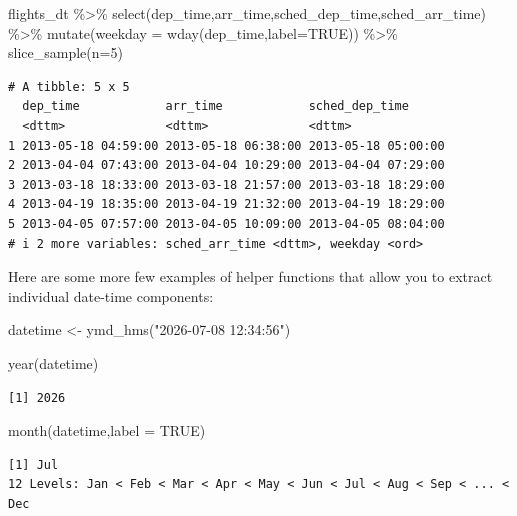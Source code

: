 \documentclass[
  letterpaper,
  DIV=11,
  numbers=noendperiod]{scrartcl}
\newenvironment{Shaded}{\begin{snugshade}}{\end{snugshade}}
\newcommand{\AttributeTok}[1]{\textcolor[rgb]{0.40,0.45,0.13}{#1}}
\newcommand{\ConstantTok}[1]{\textcolor[rgb]{0.56,0.35,0.01}{#1}}
\newcommand{\DecValTok}[1]{\textcolor[rgb]{0.68,0.00,0.00}{#1}}
\newcommand{\FunctionTok}[1]{\textcolor[rgb]{0.28,0.35,0.67}{#1}}
\newcommand{\NormalTok}[1]{\textcolor[rgb]{0.00,0.23,0.31}{#1}}
\newcommand{\OtherTok}[1]{\textcolor[rgb]{0.00,0.23,0.31}{#1}}
\newcommand{\SpecialCharTok}[1]{\textcolor[rgb]{0.37,0.37,0.37}{#1}}
\newcommand{\StringTok}[1]{\textcolor[rgb]{0.13,0.47,0.30}{#1}}
\begin{document}
\begin{Shaded}
\begin{Highlighting}[]
\NormalTok{flights\_dt }\SpecialCharTok{\%\textgreater{}\%}
   \FunctionTok{select}\NormalTok{(dep\_time,arr\_time,sched\_dep\_time,sched\_arr\_time) }\SpecialCharTok{\%\textgreater{}\%}
  \FunctionTok{mutate}\NormalTok{(}\AttributeTok{weekday =} \FunctionTok{wday}\NormalTok{(dep\_time,}\AttributeTok{label=}\ConstantTok{TRUE}\NormalTok{)) }\SpecialCharTok{\%\textgreater{}\%}
  \FunctionTok{slice\_sample}\NormalTok{(}\AttributeTok{n=}\DecValTok{5}\NormalTok{)}
\end{Highlighting}
\end{Shaded}

\begin{verbatim}
# A tibble: 5 x 5
  dep_time            arr_time            sched_dep_time     
  <dttm>              <dttm>              <dttm>             
1 2013-05-18 04:59:00 2013-05-18 06:38:00 2013-05-18 05:00:00
2 2013-04-04 07:43:00 2013-04-04 10:29:00 2013-04-04 07:29:00
3 2013-03-18 18:33:00 2013-03-18 21:57:00 2013-03-18 18:29:00
4 2013-04-19 18:35:00 2013-04-19 21:32:00 2013-04-19 18:29:00
5 2013-04-05 07:57:00 2013-04-05 10:09:00 2013-04-05 08:04:00
# i 2 more variables: sched_arr_time <dttm>, weekday <ord>
\end{verbatim}

Here are some more few examples of helper functions that allow you to
extract individual date-time components:

\begin{Shaded}
\begin{Highlighting}[]
\NormalTok{datetime }\OtherTok{\textless{}{-}} \FunctionTok{ymd\_hms}\NormalTok{(}\StringTok{"2026{-}07{-}08 12:34:56"}\NormalTok{)}

\FunctionTok{year}\NormalTok{(datetime)}
\end{Highlighting}
\end{Shaded}

\begin{verbatim}
[1] 2026
\end{verbatim}

\begin{Shaded}
\begin{Highlighting}[]
\FunctionTok{month}\NormalTok{(datetime,}\AttributeTok{label =} \ConstantTok{TRUE}\NormalTok{)}
\end{Highlighting}
\end{Shaded}

\begin{verbatim}
[1] Jul
12 Levels: Jan < Feb < Mar < Apr < May < Jun < Jul < Aug < Sep < ... < Dec
\end{verbatim}
\end{document}
